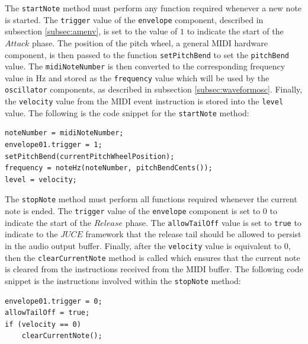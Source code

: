 \documentclass[a4paper,12pt]{report}
\begin{document}
The \texttt{start\-Note} method must perform any function required whenever a new note is started. The \texttt{trigger} value of the \texttt{envelope} component, described in subsection \ref{subsec:amenv}, is set to the value of $1$ to indicate the start of the $Attack$ phase. The position of the pitch wheel, a general MIDI hardware component, is then passed to the function \texttt{set\-Pitch\-Bend} to set the \texttt{pitch\-Bend} value. The \texttt{midi\-Note\-Number} is then converted to the corresponding frequency value in Hz and stored as the \texttt{frequency} value which will be used by the \texttt{oscillator} components, as described in subsection \ref{subsec:waveformosc}. Finally, the \texttt{velocity} value from the MIDI event instruction is stored into the \texttt{level} value. The following is the code snippet for the \texttt{start\-Note} method:

 \noindent\begin{minipage}{\linewidth} \begin{lstlisting}[caption={startNote()},label={code:startnote},captionpos=b]
noteNumber = midiNoteNumber;
envelope01.trigger = 1;
setPitchBend(currentPitchWheelPosition);
frequency = noteHz(noteNumber, pitchBendCents());
level = velocity;
\end{lstlisting} \end{minipage}

The \texttt{stop\-Note} method must perform all functions required whenever the current note is ended. The \texttt{trigger} value of the \texttt{envelope} component is set to $0$ to indicate the start of the $Release$ phase. The \texttt{allow\-Tail\-Off} value is set to \texttt{true} to indicate to the $JUCE$ framework that the release tail should be allowed to persist in the audio output buffer. Finally, after the \texttt{velocity} value is equivalent to $0$, then the \texttt{clear\-Current\-Note} method is called which ensures that the current note is cleared from the instructions received from the MIDI buffer. The following code snippet is the instructions involved within the \texttt{stop\-Note} method:

 \noindent\begin{minipage}{\linewidth} \begin{lstlisting}[caption={stopNote()},label={code:stopnote},captionpos=b]
envelope01.trigger = 0;
allowTailOff = true;
if (velocity == 0)
    clearCurrentNote();
\end{lstlisting} \end{minipage}
\end{document}
